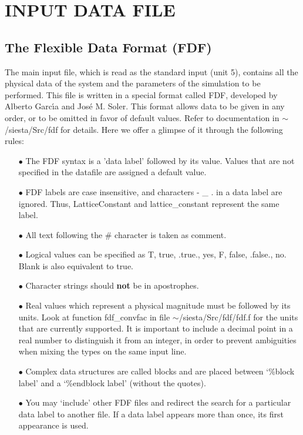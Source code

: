 \documentclass[11pt]{article}
\begin{document}
\section{INPUT DATA FILE}

\subsection{The Flexible Data Format (FDF)}

The main input file,
which is read as the standard input (unit 5),
contains all the physical data of the system and the parameters of 
the simulation to be performed.
This file is written in a special format called FDF, developed by 
Alberto Garc\'{\i}a and Jos\'e M. Soler. This format allows data to be 
given in any order, or to be omitted in favor of default values.
Refer to documentation in $\sim$/siesta/Src/fdf for details.
Here we offer a glimpse of it through the following rules:

\begin{itemize}

\item[$\bullet$] The FDF syntax is a 'data label' followed by its value.
Values that are not specified in the datafile are assigned
a default value. 

\item[$\bullet$] FDF labels are case insensitive, and characters - \_ . 
in a data label are ignored. Thus, LatticeConstant and
lattice\_constant represent the same label.

\item[$\bullet$] All text following the \# character is taken as comment.

\item[$\bullet$] Logical values can be specified as T, true, .true.,
yes, F, false, .false., no. Blank is also equivalent to true.

\item[$\bullet$] Character strings should {\bf not} be in apostrophes.

\item[$\bullet$] Real values which represent a physical magnitude must be
followed by its units. Look at function fdf\_convfac in
file $\sim$/siesta/Src/fdf/fdf.f for the units that are currently supported.
It is important to include a decimal point in a real number to distinguish
it from an integer, in order to prevent ambiguities when mixing the types
on the same input line.

\item[$\bullet$] Complex data structures are called blocks and are
placed between `\%block label' and a `\%endblock label' 
(without the quotes).

\item[$\bullet$] You may `include' other FDF files and redirect the search
for a particular data label to another file. 
If a data label appears more than once, its first appearance
is used.

\end{itemize}
\end{document}
